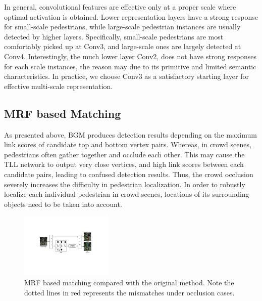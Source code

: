 \documentclass[runningheads]{llncs}
\begin{document}
In general, convolutional features are effective only at a proper scale where optimal activation is obtained. Lower representation layers have a strong response for small-scale pedestrians, while large-scale pedestrian instances are usually detected by higher layers. Specifically, small-scale pedestrians are most comfortably picked up at Conv3, and large-scale ones are largely detected at Conv4. Interestingly, the much lower layer Conv2, does not have strong responses for each scale instances, the reason may due to its primitive and limited semantic characteristics. In practice, we choose Conv3 as a satisfactory starting layer for effective multi-scale representation.

\subsection{MRF based Matching}

As presented above, BGM produces detection results depending on the maximum link scores of candidate top and bottom vertex pairs. Whereas, in crowd scenes, pedestrians often gather together and occlude each other. This may cause the TLL network to output very close vertices, and high link scores between each candidate pairs, leading to confused detection results. Thus, the crowd occlusion severely increases the difficulty in pedestrian localization. In order to robustly localize each individual pedestrian in crowd scenes, locations of its surrounding objects need to be taken into account.
\begin{figure}[t]
	\centering
	\includegraphics[height=3.1cm]{5_mrf.pdf}
	\caption{MRF based matching compared with the original method. Note the dotted lines in red represents the mismatches under occlusion cases.}
	\label{fig5}
\end{figure}
\end{document}
